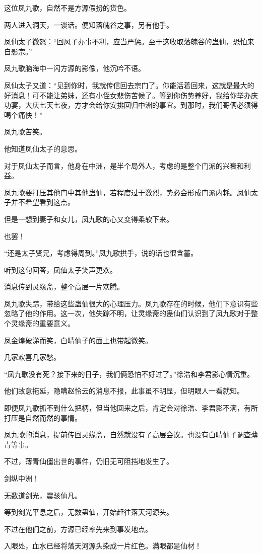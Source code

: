 \begin{this_body}
这位凤九歌，自然不是方源假扮的货色。

两人进入洞天，一谈话。便知落魄谷之事，另有他手。

凤仙太子微怒：“回风子办事不利，应当严惩。至于这收取落魄谷的蛊仙，恐怕来自影宗。”

凤九歌脑海中一闪方源的影像，他沉吟不语。

凤仙太子又道：“见到你时，我就传信回去宗门了。你能活着回来，这就是最大的好消息！可不能让弟妹，还有小侄女悲伤苦候了。等到你伤势养好，我给你举办庆功宴，大庆七天七夜，方才会给你安排回归中洲的事宜。到那时，我们哥俩必须得喝个痛快！”

凤九歌苦笑。

他知道凤仙太子的意思。

对于凤仙太子而言，他身在中洲，是半个局外人，考虑的是整个门派的兴衰和利益。

凤九歌要打压其他门中其他蛊仙，若程度过于激烈，势必会形成门派内耗。凤仙太子并不希望看到这点。

但是一想到妻子和女儿，凤九歌的心又变得柔软下来。

也罢！

“还是太子贤兄，考虑得周到。”凤九歌拱手，说的话也很含蓄。

听到这句回答，凤仙太子笑声更欢。

消息传到灵缘斋，整个高层一片欢腾。

凤九歌失踪，带给这些蛊仙很大的心理压力。凤九歌存在的时候，他们下意识有些忽略了他的作用。这一次，他失踪不明，让灵缘斋的蛊仙们认识到了凤九歌对于整个灵缘斋的重要意义。

凤金煌破涕而笑，白晴仙子的面上也带起微笑。

几家欢喜几家愁。

“凤九歌没有死？接下来的日子，我们俩恐怕不好过了。”徐浩和李君影心情沉重。

他们故意拖延，隐瞒赵怜云的消息不报，此事虽不明显，但明眼人一看就知。

即便凤九歌抓不到什么把柄，但当他回来之后，肯定会对徐浩、李君影不满，有所打压是自然而然的事情。

凤九歌的消息，提前传回灵缘斋，自然就没有了高层会议。也没有白晴仙子调查薄青等事。

不过，薄青仙僵出世的事件，仍旧无可阻挡地发生了。

剑纵中洲！

无数道剑光，震骇仙凡。

等到剑光平息之后，无数蛊仙，开始赶往落天河源头。

不过在他们之前，方源已经率先来到事发地点。

入眼处，血水已经将落天河源头染成一片红色。满眼都是仙材！

\end{this_body}

